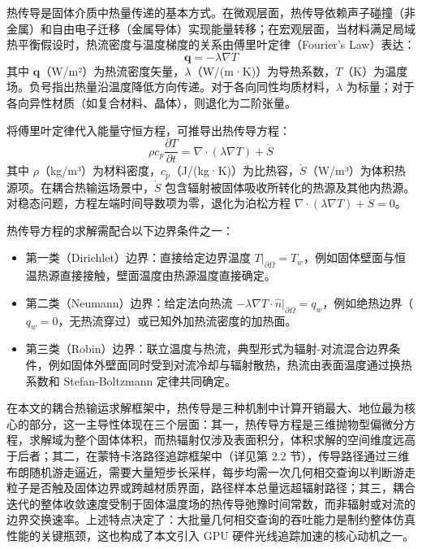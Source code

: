 热传导是固体介质中热量传递的基本方式。在微观层面，热传导依赖声子碰撞（非金属）和自由电子迁移（金属导体）实现能量转移；在宏观层面，当材料满足局域热平衡假设时，热流密度与温度梯度的关系由傅里叶定律（Fourier's Law）表达：
\begin{equation}
    \mathbf{q} = -\lambda \nabla T
    \label{eq:fourier}
\end{equation}
其中 $\mathbf{q}$（W/m²）为热流密度矢量，$\lambda$（W/(m·K)）为导热系数，$T$（K）为温度场。负号指出热量沿温度降低方向传递。对于各向同性均质材料，$\lambda$ 为标量；对于各向异性材质（如复合材料、晶体），则退化为二阶张量。

将傅里叶定律代入能量守恒方程，可推导出热传导方程：
\begin{equation}
    \rho c_p \frac{\partial T}{\partial t} = \nabla \cdot (\lambda \nabla T) + \dot{S}
    \label{eq:heat_conduction}
\end{equation}
其中 $\rho$（kg/m³）为材料密度，$c_p$（J/(kg·K)）为比热容，$\dot{S}$（W/m³）为体积热源项。在耦合热输运场景中，$\dot{S}$ 包含辐射被固体吸收所转化的热源及其他内热源。对稳态问题，方程左端时间导数项为零，退化为泊松方程 $\nabla \cdot (\lambda \nabla T) + \dot{S} = 0$。

热传导方程的求解需配合以下边界条件之一：
\begin{itemize}
    \item 第一类（Dirichlet）边界：直接给定边界温度 $T|_{\partial\Omega} = T_w$，例如固体壁面与恒温热源直接接触，壁面温度由热源温度直接确定。
    \item 第二类（Neumann）边界：给定法向热流 $-\lambda \nabla T \cdot \hat{n}|_{\partial\Omega} = q_w$，例如绝热边界（$q_w = 0$，无热流穿过）或已知外加热流密度的加热面。
    \item 第三类（Robin）边界：联立温度与热流，典型形式为辐射-对流混合边界条件，例如固体外壁面同时受到对流冷却与辐射散热，热流由表面温度通过换热系数和 Stefan-Boltzmann 定律共同确定。
\end{itemize}

在本文的耦合热输运求解框架中，热传导是三种机制中计算开销最大、地位最为核心的部分，这一主导性体现在三个层面：其一，热传导方程是三维抛物型偏微分方程，求解域为整个固体体积，而热辐射仅涉及表面积分，体积求解的空间维度远高于后者；其二，在蒙特卡洛路径追踪框架中（详见第 2.2 节），传导路径通过三维布朗随机游走逼近，需要大量短步长采样，每步均需一次几何相交查询以判断游走粒子是否触及固体边界或跨越材质界面，路径样本总量远超辐射路径；其三，耦合迭代的整体收敛速度受制于固体温度场的热传导弛豫时间常数，而非辐射或对流的边界交换速率。上述特点决定了：大批量几何相交查询的吞吐能力是制约整体仿真性能的关键瓶颈，这也构成了本文引入 GPU 硬件光线追踪加速的核心动机之一。

